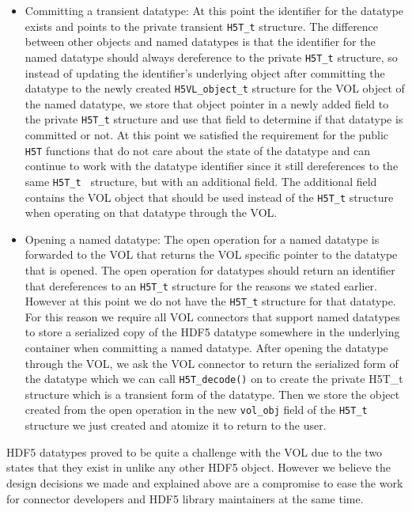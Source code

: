 \begin{itemize}
\item Committing a transient datatype: At this point the identifier for the datatype exists and points to the private transient {\tt H5T\_t} structure. The difference between other objects and named datatypes is that the identifier for the named datatype should always dereference to the private {\tt H5T\_t} structure, so instead of updating the identifier's underlying object after committing the datatype to the newly created {\tt H5VL\_object\_t} structure for the VOL object of the named datatype, we store that object pointer in a newly added field to the private {\tt H5T\_t} structure and use that field to determine if that datatype is committed or not. At this point we satisfied the requirement for the public {\tt H5T} functions that do not care about the state of the datatype and can continue to work with the datatype identifier since it still dereferences to the same {\tt H5T\_t } structure, but with an additional field. The additional field contains the VOL object that should be used instead of the {\tt H5T\_t} structure when operating on that datatype through the VOL.

\item Opening a named datatype: The open operation for a named datatype is forwarded to the VOL that returns the VOL specific pointer to the datatype that is opened. The open operation for datatypes should return an identifier that dereferences to an {\tt H5T\_t} structure for the reasons we stated earlier. However at this point we do not have the {\tt H5T\_t} structure for that datatype. For this reason we require all VOL connectors that support named datatypes to store a serialized copy of the HDF5 datatype somewhere in the underlying container when committing a named datatype. After opening the datatype through the VOL, we ask the VOL connector to return the serialized form of the datatype which we can call {\tt H5T\_decode()} on to create the private {H5T\_t} structure which is a transient form of the datatype. Then we store the object created from the open operation in the new {\tt vol\_obj} field of the {\tt H5T\_t} structure we just created and atomize it to return to the user.
\end{itemize}

HDF5 datatypes proved to be quite a challenge with the VOL due to the two states that they exist in unlike any other HDF5 object. However we believe the design decisions we made and explained above are a compromise to ease the work for connector developers and HDF5 library maintainers at the same time.

